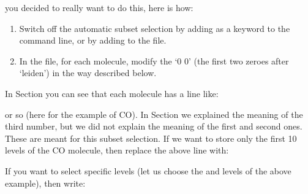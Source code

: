 \documentclass[letterpaper,10pt,english]{sphinxmanual}
\begin{document}
 you decided to really want to do this, here is how:
\begin{enumerate}
%
\item {} 
Switch off the automatic subset selection by adding  as
a keyword to the command line, or by adding  to
the  file.

\item {} 
In the  file, for each molecule, modify the
‘0 0’ (the first two zeroes after ‘leiden’) in the way described below.

\end{enumerate}

In Section {\hyperref[\detokenize{lineradtrans:sec-line-dot-inp}]{}} you can see that each molecule has a line
like:

\begin{sphinxVerbatim}[commandchars=\\\{\}]
          
\end{sphinxVerbatim}

or so (here for the example of CO). In Section {\hyperref[\detokenize{lineradtrans:sec-line-dot-inp}]{}} we
explained the meaning of the third number, but we did not explain the meaning of
the first and second ones. These are meant for this subset selection. If we want
to store only the first 10 levels of the CO molecule, then replace the above
line with:

\begin{sphinxVerbatim}[commandchars=\\\{\}]
          
\end{sphinxVerbatim}

If you want to select specific levels (let us choose the  and
 levels of the above example), then write:

\begin{sphinxVerbatim}[commandchars=\\\{\}]
          
 
\end{sphinxVerbatim}
\end{document}
